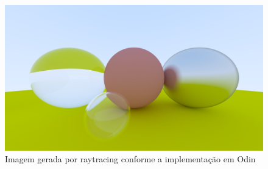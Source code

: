 \documentclass[english, 
               brazil, 
               bsc] %
               {dcomp-abntex2}
\begin{document}
\begin{figure}[H]
	\caption{\label{imagem-raytrace} \small Imagem gerada por raytracing conforme a implementação em Odin}
	\begin{center}
	    \includegraphics[scale=0.5]{./Imagens/ray_tracer.png}
	\end{center}
\end{figure}

% 

% 
% 
% 
% 




\postextual

\renewcommand{\chapnumfont}{\chaptitlefont}
\renewcommand{\afterchapternum}{}
% 
% 
\end{document}

